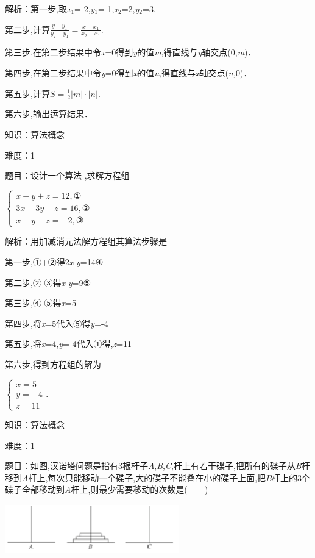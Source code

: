 \documentclass{article} %
\begin{document}
解析：第一步,取\textit{x}${}_{1}$=-2,\textit{y}${}_{1}$=-1,\textit{x}${}_{2}$=2,\textit{y}${}_{2}$=3.

第二步,计算$\frac{y-y_1}{y_2-y_1}=\frac{x-x_1}{x_2-x_1}$.

第三步,在第二步结果中令\textit{x}=0得到\textit{y}的值\textit{m},得直线与\textit{y}轴交点(0,\textit{m})．

第四步,在第二步结果中令\textit{y}=0得到\textit{x}的值\textit{n},得直线与\textit{x}轴交点(\textit{n,}0)．

第五步,计算$S=\frac{1}{2}|m|\cdot|n|$.

第六步,输出运算结果．

知识：算法概念

难度：1

题目：设计一个算法 ,求解方程组

$\left\{\begin{array}{l}
	x+y+z=12,\text{①}\\
	3x-3y-z=16,\text{②}\\
	x-y-z=-2,\text{③}
\end{array}\right.$

解析：用加减消元法解方程组其算法步骤是

第一步,①+②得2\textit{x}-\textit{y}=14④

第二步,②-③得\textit{x}-\textit{y}=9⑤

第三步,④-⑤得\textit{x}=5

第四步,将\textit{x}=5代入⑤得\textit{y}=-4

第五步,将\textit{x}=4,\textit{y}=-4代入①得,\textit{z}=11

第六步,得到方程组的解为

$\left\{\begin{array}{l}
x=5\\
y=-4\\
z=11
\end{array}\right.$.



知识：算法概念

难度：1

题目：如图,汉诺塔问题是指有3根杆子\textit{A},\textit{B},\textit{C},杆上有若干碟子,把所有的碟子从\textit{B}杆移到\textit{A}杆上,每次只能移动一个碟子,大的碟子不能叠在小的碟子上面,把\textit{B}杆上的3个碟子全部移动到\textit{A}杆上,则最少需要移动的次数是(　　)

\includegraphics*[width=2.97in, height=0.84in, keepaspectratio=false]{image3}
\end{document}

